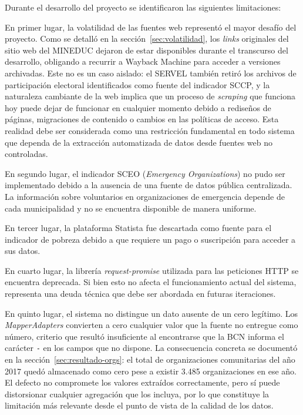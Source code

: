 \documentclass[12pt,letterpaper,oneside]{report}
\begin{document}
Durante el desarrollo del proyecto se identificaron las siguientes limitaciones:

En primer lugar, la volatilidad de las fuentes web represent\'o el mayor desaf\'io del proyecto. Como se detall\'o en la secci\'on~\ref{sec:volatilidad}, los \textit{links} originales del sitio web del MINEDUC dejaron de estar disponibles durante el transcurso del desarrollo, obligando a recurrir a Wayback Machine para acceder a versiones archivadas. Este no es un caso aislado: el SERVEL tambi\'en retir\'o los archivos de participaci\'on electoral identificados como fuente del indicador SCCP, y la naturaleza cambiante de la web implica que un proceso de \textit{scraping} que funciona hoy puede dejar de funcionar en cualquier momento debido a redise\~nos de p\'aginas, migraciones de contenido o cambios en las pol\'iticas de acceso. Esta realidad debe ser considerada como una restricci\'on fundamental en todo sistema que dependa de la extracci\'on automatizada de datos desde fuentes web no controladas.

En segundo lugar, el indicador SCEO (\textit{Emergency Organizations}) no pudo ser implementado debido a la ausencia de una fuente de datos p\'ublica centralizada. La informaci\'on sobre voluntarios en organizaciones de emergencia depende de cada municipalidad y no se encuentra disponible de manera uniforme.

En tercer lugar, la plataforma Statista fue descartada como fuente para el indicador de pobreza debido a que requiere un pago o suscripci\'on para acceder a sus datos.

En cuarto lugar, la librer\'ia \textit{request-promise} utilizada para las peticiones HTTP se encuentra deprecada. Si bien esto no afecta el funcionamiento actual del sistema, representa una deuda t\'ecnica que debe ser abordada en futuras iteraciones.

En quinto lugar, el sistema no distingue un dato ausente de un cero leg\'itimo. Los \textit{MapperAdapters} convierten a cero cualquier valor que la fuente no entregue como n\'umero, criterio que result\'o insuficiente al encontrarse que la BCN informa el car\'acter \texttt{-} en los campos que no dispone. La consecuencia concreta se document\'o en la secci\'on~\ref{sec:resultado-orgs}: el total de organizaciones comunitarias del a\~no 2017 qued\'o almacenado como cero pese a existir 3.485 organizaciones en ese a\~no. El defecto no compromete los valores extra\'idos correctamente, pero s\'i puede distorsionar cualquier agregaci\'on que los incluya, por lo que constituye la limitaci\'on m\'as relevante desde el punto de vista de la calidad de los datos.
\end{document}
